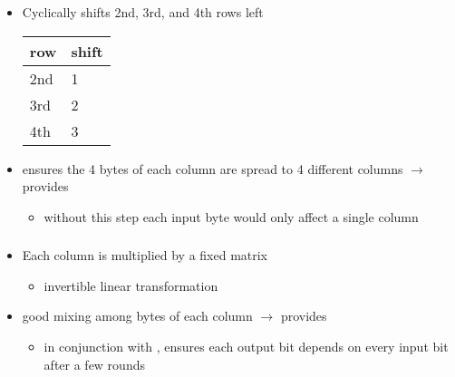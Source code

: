 \documentclass[draft]{article}
\begin{document}
\subsubsection*{}
\begin{itemize}[nosep]
    \item Cyclically shifts 2nd, 3rd, and 4th rows left

          \begin{tabular}{ll}
              row & shift \\\toprule
              2nd & 1     \\
              3rd & 2     \\
              4th & 3     \\\bottomrule
          \end{tabular}
    \item ensures the 4 bytes of each column are spread to 4 different columns $\rightarrow$ provides 
          \begin{itemize}[nosep]
              \item without this step each input byte would only affect a single column
          \end{itemize}
\end{itemize}
\subsubsection*{}
\begin{itemize}[nosep]
    \item Each column is multiplied by a fixed matrix
          \begin{itemize}[nosep]
              \item invertible linear transformation
          \end{itemize}
    \item good mixing among bytes of each column $\rightarrow$ provides 
          \begin{itemize}[nosep]
              \item in conjunction with , ensures each output bit depends on every input bit after a few rounds
          \end{itemize}
\end{itemize}
\end{document}
